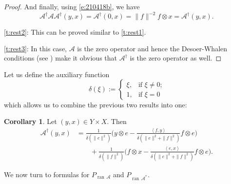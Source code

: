 \documentclass[12pt]{article}
\newcommand{\scal}[2]{\left\langle{#1},{#2}  \right\rangle}
\newcommand{\ran}{\ensuremath{{\operatorname{ran}}\,}}
\theoremstyle{definition}
\newtheorem{corollary}[theorem]{Corollary}
\providecommand{\ran}{\operatorname{ran}}
\providecommand{\ran}{\operatorname{ran}}
\begin{document}
{\begin{proof}
And finally, using \cref{e:210418b}, we have 
\begin{equation}
\mathcal{A}^\dagger \mathcal{A}\mathcal{A}^\dagger(y,x)
= \mathcal{A}^\dagger(0,x) = \|f\|^{-2}f\otimes x
= \mathcal{A}^\dagger(y,x).
\end{equation}

\cref{t:rest2}: This can be proved similar to \cref{t:rest1}. 

\cref{t:rest3}: 
In this case, $\mathcal{A}$ is the zero 
operator and hence the Desoer-Whalen conditions (see \cite[page~51]{Groetsch}) 
make it obvious that $\mathcal{A}^\dagger$ is the zero operator as well.
\end{proof}

Let us define the auxiliary function
\begin{equation}
\label{e:auxf}
\delta(\xi) := 
\begin{cases}
\xi, &\text{if $\xi\neq 0$;}\\
1, &\text{if $\xi=0$}
\end{cases}
\end{equation}
which allows us to combine the previous two results into one: 

\begin{corollary}
Let $(y,x)\in Y\times X$. Then 
\begin{align}
\mathcal{A}^\dagger(y,x)
&= 
\frac{1}{\delta(\|e\|^2)}\Big( y \otimes e - 
\frac{\scal{f}{{y}}}{\delta(\|e\|^2+\|f\|^2)} f\otimes e\Big)\\
&\qquad + 
\frac{1}{\delta(\|f\|^2)}\Big( f \otimes x - 
\frac{\scal{e}{x}}{\delta(\|e\|^2+\|f\|^2)} f\otimes e\Big). 
\end{align}
\end{corollary}

We now turn to formulas for $P_{\ran \mathcal{A}}$
and $P_{\ran\mathcal{A^*}}$. 

}
\end{document}
